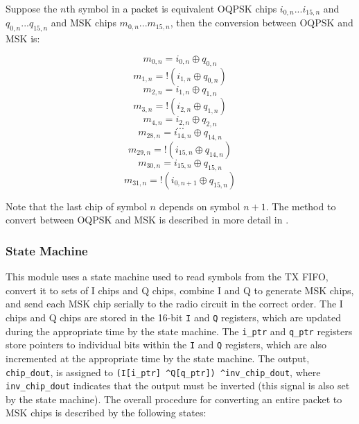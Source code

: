 Suppose the $n$th symbol in a packet is equivalent OQPSK chips $i_{0,n}...i_{15,n}$ and $q_{0,n}...q_{15,n}$ and MSK chips $m_{0,n}...m_{15,n}$, then the conversion between OQPSK and MSK is:

$$m_{0,n} = i_{0,n} \oplus q_{0,n}$$
$$m_{1,n} = !(i_{1,n} \oplus q_{0,n})$$
$$m_{2,n} = i_{1,n} \oplus q_{1,n}$$
$$m_{3,n} = !(i_{2,n} \oplus q_{1,n})$$
$$m_{4,n} = i_{2,n} \oplus q_{2,n}$$
$$...$$
$$m_{28,n} = i_{14,n} \oplus q_{14,n}$$
$$m_{29,n} = !(i_{15,n} \oplus q_{14,n})$$
$$m_{30,n} = i_{15,n} \oplus q_{15,n}$$
$$m_{31,n} = !(i_{0,n+1} \oplus q_{15,n})$$

Note that the last chip of symbol $n$ depends on symbol $n+1$. The method to convert between OQPSK and MSK is described in more detail in \cite{cadence-paper}.

\subsubsection{State Machine}
This module uses a state machine used to read symbols from the TX FIFO, convert it to sets of I chips and Q chips, combine I and Q to generate MSK chips, and send each MSK chip serially to the radio circuit in the correct order. The I chips and Q chips are stored in the 16-bit \texttt{I} and \texttt{Q} registers, which are updated during the appropriate time by the state machine. The \texttt{i\_ptr} and \texttt{q\_ptr} registers store pointers to individual bits within the \texttt{I} and \texttt{Q} registers, which are also incremented at the appropriate time by the state machine. The output, \texttt{chip\_dout}, is assigned to \texttt{(I[i\_ptr] \textasciicircum Q[q\_ptr]) \textasciicircum inv\_chip\_dout}, where \texttt{inv\_chip\_dout} indicates that the output must be inverted (this signal is also set by the state machine). The overall procedure for converting an entire packet to MSK chips is described by the following states:

